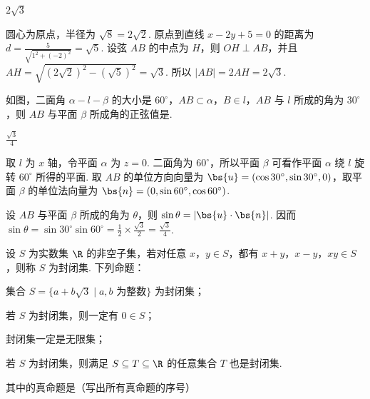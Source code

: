 \begin{answer}
\(2\sqrt{3}\)
\end{answer}

\begin{solution}
圆心为原点，半径为 \(\sqrt8=2\sqrt2\). 原点到直线 \(x-2y+5=0\) 的距离为 \(d=\frac5{\sqrt{1^2+(-2)^2}}=\sqrt5\). 设弦 \(AB\) 的中点为 \(H\)，则 \(OH\perp AB\)，并且 \(AH=\sqrt{(2\sqrt2)^2-(\sqrt5)^2}=\sqrt3\). 所以 \(|AB|=2AH=2\sqrt3\).
\end{solution}

\begin{problem}
如图，二面角 \(\alpha - l - \beta\) 的大小是 \(60^{\circ}\)，\(AB \subset \alpha\)，\(B \in l\)，\(AB\) 与 \(l\) 所成的角为 \(30^{\circ}\)，则 \(AB\) 与平面 \(\beta\) 所成角的正弦值是\fillinblank{}.

\end{problem}

\begin{answer}
\(\frac{\sqrt{3}}{4}\)
\end{answer}

\begin{solution}
取 \(l\) 为 \(x\) 轴，令平面 \(\alpha\) 为 \(z=0\). 二面角为 \(60^\circ\)，所以平面 \(\beta\) 可看作平面 \(\alpha\) 绕 \(l\) 旋转 \(60^\circ\) 所得的平面. 取 \(AB\) 的单位方向向量为 \(\bs{u}=(\cos30^\circ,\sin30^\circ,0)\)，取平面 \(\beta\) 的单位法向量为 \(\bs{n}=(0,\sin60^\circ,\cos60^\circ)\).

设 \(AB\) 与平面 \(\beta\) 所成的角为 \(\theta\)，则 \(\sin\theta=|\bs{u}\cdot\bs{n}|\). 因而 \(\sin\theta=\sin30^\circ\sin60^\circ=\frac12\times\frac{\sqrt3}{2}=\frac{\sqrt3}{4}\).
\end{solution}

\begin{problem}
设 \(S\) 为实数集 \(\R\) 的非空子集，若对任意 \(x\)，\(y \in S\)，都有 \(x + y\)，\(x - y\)，\(xy \in S\)，则称 \(S\) 为封闭集. 下列命题：

\begin{circlelist}
\item 集合 \(S = \{a + b\sqrt{3} \mid a, b\text{ 为整数}\}\) 为封闭集；
\item 若 \(S\) 为封闭集，则一定有 \(0 \in S\)；
\item 封闭集一定是无限集；
\item 若 \(S\) 为封闭集，则满足 \(S \subseteq T \subseteq \R\) 的任意集合 \(T\) 也是封闭集.
\end{circlelist}

其中的真命题是\fillinblank{}（写出所有真命题的序号）
\end{problem}

